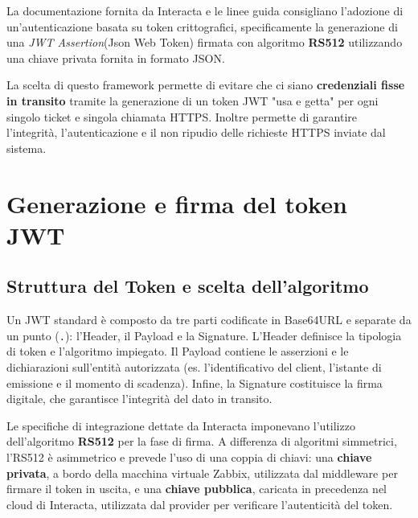 \documentclass[12pt, a4paper, oneside]{report}
\begin{document}
La documentazione fornita da Interacta e le linee guida consigliano l'adozione di un'autenticazione basata su token crittografici, specificamente la generazione di una \textit{JWT Assertion}(Json Web Token)\parencite{rfc7519}
firmata con algoritmo \textbf{RS512} utilizzando una chiave privata fornita in formato JSON.

La scelta di questo framework permette di evitare che ci siano \textbf{ credenziali fisse in transito} tramite la generazione di un token JWT "usa e getta" per ogni singolo ticket e singola chiamata HTTPS.
Inoltre permette di garantire l'integrità, l'autenticazione e il non ripudio delle richieste HTTPS inviate dal sistema.

\section{Generazione e firma del token JWT}


\subsection{Struttura del Token e scelta dell'algoritmo}
Un JWT standard è composto da tre parti codificate in Base64URL e separate da un punto (\texttt{.}): l'Header, il Payload e la Signature.
L'Header definisce la tipologia di token e l'algoritmo impiegato. Il Payload contiene le asserzioni e le dichiarazioni sull'entità autorizzata (es. l'identificativo del client, l'istante di emissione e il momento di scadenza). Infine, la Signature costituisce la firma digitale, che garantisce l'integrità del dato in transito.

Le specifiche di integrazione dettate da Interacta imponevano l'utilizzo dell'algoritmo \textbf{RS512} per la fase di firma.
A differenza di algoritmi simmetrici, l'RS512 è asimmetrico e prevede l'uso di una coppia di chiavi: una \textbf{chiave privata}, a bordo della macchina virtuale Zabbix, utilizzata dal middleware per firmare il token in uscita, e una \textbf{chiave pubblica}, caricata in precedenza nel cloud di Interacta, utilizzata dal provider per verificare l'autenticità del token.
\end{document}

